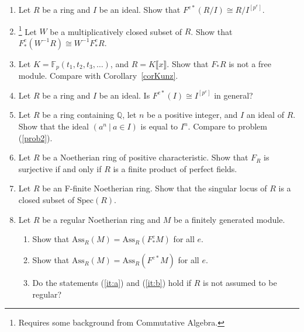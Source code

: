 \documentclass[12pt]{amsart}
\theoremstyle{definition}
\numberwithin{equation}{theorem}
\def\FF{\mathbb{F}}
\def\QQ{\mathbb{Q}}
\begin{document}
\begin{enumerate}
\begin{samepage}
\begin{enumerate}
\end{enumerate}
\end{samepage}
\item Let $R$ be a ring and $I$ be an ideal. Show that $F^{e*}(R/I) \cong R/I^{[p^e]}$.
\item \footnote[2]{Requires some background from Commutative Algebra.} Let $W$ be a multiplicatively closed subset of $R$. Show that $F^e_* (W^{-1}R) \cong W^{-1} F^e_*R$. 
\item Let $K = \FF_p(t_1,t_2,t_3,\dots)$, and $R= K\llbracket x\rrbracket$. Show that $F_*R$ is not a free module. Compare with Corollary~\ref{corKunz}.
\item Let $R$ be a ring and $I$ be an ideal. Is $F^{e*}(I) \cong I^{[p^e]}$ in general?
\item Let $R$ be a ring containing $\QQ$, let $n$ be a positive integer, and $I$ an ideal of $R$. Show that the ideal $( a^n \ | \ a\in I)$ is equal to $I^n$. Compare to problem (\ref{prob2}).
\item\footnotemark[2] Let $R$ be a Noetherian ring of positive characteristic. Show that $F_R$ is surjective if and only if $R$ is a finite product of perfect fields.
\item\footnotemark[2] Let $R$ be an F-finite Noetherian ring. Show that the singular locus of $R$ is a closed subset of $\mathrm{Spec}(R)$.
\item\footnotemark[2] Let $R$ be a regular Noetherian ring and $M$ be a finitely generated module.
\begin{enumerate}
\item\label{it:a} Show that $\mathrm{Ass}_R(M) = \mathrm{Ass}_R(F^e_* M)$ for all $e$.
\item\label{it:b} Show that $\mathrm{Ass}_R(M) = \mathrm{Ass}_R(F^{e*} M)$ for all $e$.
\item Do the statements (\ref{it:a}) and (\ref{it:b}) hold if $R$ is not assumed to be regular?
\end{enumerate}
\end{enumerate}
\end{document}
